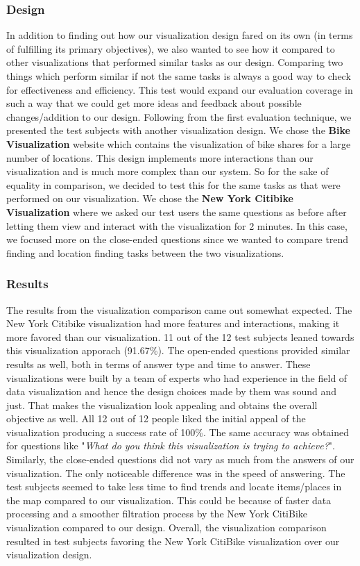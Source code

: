 \subsubsection{Design}
In addition to finding out how our visualization design fared on its own (in terms of fulfilling its primary objectives), we also wanted to see how it compared to other visualizations that performed similar tasks as our design. Comparing two things which perform similar if not the same tasks is always a good way to check for effectiveness and efficiency. This test would expand our evaluation coverage in such a way that we could get more ideas and feedback about possible changes/addition to our design.\newline
Following from the first evaluation technique, we presented the test subjects with another visualization design. We chose the \textbf{Bike Visualization} website which contains the visualization of bike shares for a large number of locations. This design implements more interactions than our visualization and is much more complex than our system. So for the sake of equality in comparison, we decided to test this for the same tasks as that were performed on our visualization. We chose the \textbf{New York Citibike Visualization} where we asked our test users the same questions as before after letting them view and interact with the visualization for 2 minutes. In this case, we focused more on the close-ended questions since we wanted to compare trend finding and location finding tasks between the two visualizations.
\subsubsection{Results}
The results from the visualization comparison came out somewhat expected. The New York Citibike visualization had more features and interactions, making it more favored than our visualization. 11 out of the 12 test subjects leaned towards this visualization apporach (91.67\%).\newline
The open-ended questions provided similar results as well, both in terms of answer type and time to answer. These visualizations were built by a team of experts who had experience in the field of data visualization and hence the design choices made by them was sound and just. That makes the visualization look appealing and obtains the overall objective as well. All 12 out of 12 people liked the initial appeal of the visualization producing a success rate of 100\%. The same accuracy was obtained for questions like "\textit{What do you think this visualization is trying to achieve?}".\newline
Similarly, the close-ended questions did not vary as much from the answers of our visualization. The only noticeable difference was in the speed of answering. The test subjects seemed to take less time to find trends and locate items/places in the map compared to our visualization. This could be because of faster data processing and a smoother filtration process by the New York CitiBike visualization compared to our design.\newline
Overall, the visualization comparison resulted in test subjects favoring the New York CitiBike visualization over our visualization design.
